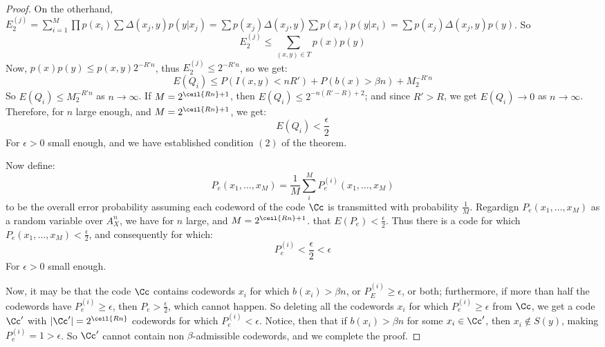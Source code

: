 \begin{proof}
    On the otherhand,
    $E_2^{(j)}=\sum_{i=1}^M{\prod{p(x_i)}}\sum{\Delta(x_j,y)p(y|x_j)}=
    \sum{p(x_j)\Delta(x_j,y)}\sum{p(x_i)p(y|x_i)}=\sum{p(x_j)\Delta(x_j,y)p(y)}$.
    So
    \begin{equation*}
        E_2^{(j)} \leq \sum_{(x,y) \in T}{p(x)p(y)}
    \end{equation*}
    Now, $p(x)p(y) \leq p(x,y)2^{-R'n}$, thus $E_2^{(j)} \leq 2^{-R'n}$, so we
    get:
    \begin{equation*}
        E(Q_i) \leq P(I(x,y)<nR')+P(b(x)>\beta n)+M_2^{-R'n}
    \end{equation*}
    So $E(Q_i) \leq M_2^{-R'n}$ as $n \rightarrow \infty$. If
    $M=2^{\ceil{Rn}+1}$, then $E(Q_i) \leq 2^{-n(R'-R)+2}$; and since $R'>R$, we
    get  $E(Q_i) \rightarrow 0$ as $n \rightarrow \infty$. Therefore, for $n$
    large enough, and  $M=2^{\ceil{Rn}+1}$, we get:
    \begin{equation*}
        E(Q_i)<\frac{\epsilon}{2}
    \end{equation*}
    For $\epsilon>0$ small enough, and we have established condition $(2)$ of
    the theorem.

    Now define:
    \begin{equation*}
        P_e(x_1, \dots, x_M)=\frac{1}{M}\sum_{i}^M{P_e^{(i)}(x_1, \dots, x_M)}
    \end{equation*}
    to be the overall error probability assuming each codeword of the code $\Cc$
    is transmitted with probability $\frac{1}{M}$. Regardign
    $P_e(x_1, \dots, x_M)$ as a random variable over $A_X^n$, we have for  $n$
    large, and  $M=2^{\ceil{Rn}+1}$. that $E(P_e)<\frac{\epsilon}{2}$. Thus
    there is a code for which $P_e(x_1, \dots, x_M)<\frac{\epsilon}{2}$, and
    consequently for which:
    \begin{equation*}
        P_e^{(i)}<\frac{\epsilon}{2}<\epsilon
    \end{equation*}
    For $\epsilon>0$ small enough.

    Now, it may be that the code $\Cc$ contains codewords $x_i$ for which
    $b(x_i)> \beta n$, or $P_E^{(i)} \geq \epsilon$, or both; furthermore, if
    more than half the codewords have $P_e^{(i)} \geq \epsilon$, then
    $P_e>\frac{\epsilon}{2}$, which cannot happen. So deleting all the codewords
    $x_i$ for which $P_e^{(i)} \geq \epsilon$ from $\Cc$, we get a code  $\Cc'$
    with  $|\Cc'|=2^{\ceil{Rn}}$ codewords for which $P_e^{(i)}<\epsilon$.
    Notice, then that if $b(x_i)>\beta n$ for some $x_i \in \Cc'$, then  $x_i
    \notin S(y)$, making $P_e^{(i)}=1>\epsilon$. So $\Cc'$ cannot contain non
    $\beta$-admissible codewords, and we complete the proof.
\end{proof}
